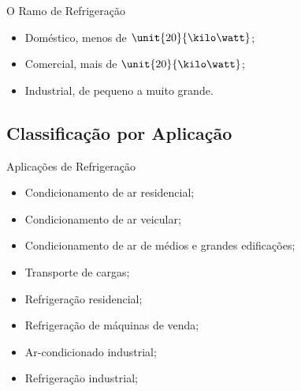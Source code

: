     \begin{frame}{O Ramo de Refrigeração}\vspace*{-0em}
        \begin{itemize}
            \item<1-> Doméstico, \alert{menos de $\unit{20}{\kilo\watt}$};
            \item<2-> Comercial, \alert{mais de $\unit{20}{\kilo\watt}$};
            \item<3-> Industrial, \alert{de pequeno a muito grande}.
        \end{itemize}
    \end{frame}

\subsection{Classificação por Aplicação}

    \begin{frame}{Aplicações de Refrigeração}\vspace*{-0em}
        \begin{itemize}
            \item<1-> Condicionamento de ar residencial;
            \item<2-> Condicionamento de ar veicular;
            \item<3-> Condicionamento de ar de médios e grandes edificações;
            \item<4-> Transporte de cargas;
            \item<5-> Refrigeração residencial;
            \item<6-> Refrigeração de máquinas de venda;
            \item<7-> Ar-condicionado industrial;
            \item<8-> Refrigeração industrial;
        \end{itemize}
    \end{frame}


